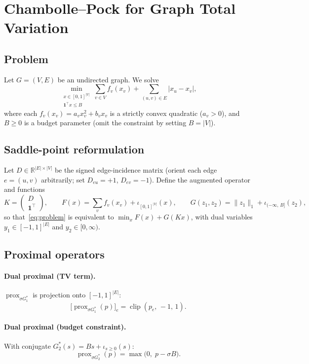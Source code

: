 \documentclass{article}
\newcommand{\clip}{\operatorname{clip}}
\newcommand{\R}{\mathbb{R}}
\begin{document}
\section*{Chambolle--Pock for Graph Total Variation}

\subsection*{Problem}

Let $G = (V, E)$ be an undirected graph. We solve
\begin{equation}
  \min_{\substack{x \in [0,1]^{|V|} \\ \mathbf{1}^\top x \leq B}}
  \sum_{v \in V} f_v(x_v)
  + \sum_{(u,v) \in E} |x_u - x_v|,
  \label{eq:problem}
\end{equation}
where each $f_v(x_v) = a_v x_v^2 + b_v x_v$ is a strictly convex quadratic
($a_v > 0$), and $B \geq 0$ is a budget parameter (omit the constraint by
setting $B = |V|$).

\subsection*{Saddle-point reformulation}

Let $D \in \R^{|E| \times |V|}$ be the signed edge-incidence matrix (orient
each edge $e = (u,v)$ arbitrarily; set $D_{eu} = +1$, $D_{ev} = -1$).
Define the augmented operator and functions
\[
  K = \begin{pmatrix} D \\ \mathbf{1}^\top \end{pmatrix},
  \qquad
  F(x) = \sum_{v} f_v(x_v) + \iota_{[0,1]^{|V|}}(x),
  \qquad
  G(z_1, z_2) = \|z_1\|_1 + \iota_{(-\infty,\, B]}(z_2),
\]
so that~\eqref{eq:problem} is equivalent to $\min_x F(x) + G(Kx)$, with
dual variables $y_1 \in [-1,1]^{|E|}$ and $y_2 \in [0,\infty)$.

\subsection*{Proximal operators}

\paragraph{Dual proximal (TV term).}
$\operatorname{prox}_{\sigma G_1^*}$ is projection onto $[-1,1]^{|E|}$:
\[
  \bigl[\operatorname{prox}_{\sigma G_1^*}(p)\bigr]_e
  = \clip(p_e,\,-1,\,1).
\]

\paragraph{Dual proximal (budget constraint).}
With conjugate $G_2^*(s) = Bs + \iota_{s \geq 0}(s)$:
\[
  \operatorname{prox}_{\sigma G_2^*}(p)
  = \max\bigl(0,\; p - \sigma B\bigr).
\]
\end{document}
